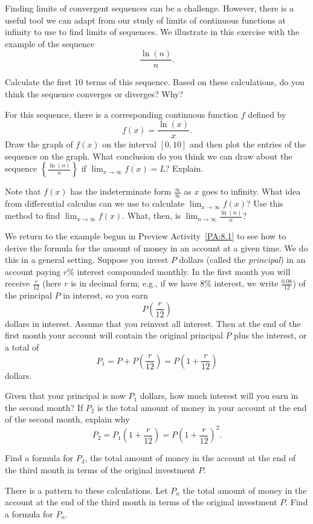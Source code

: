 \begin{exercises}
\item Finding limits of convergent sequences can be a challenge. However, there is a useful tool we can adapt from our study of limits of continuous functions at infinity to use to find limits of sequences. We illustrate in this exercise with the example of the sequence
    \[\frac{\ln(n)}{n}.\]
    \ba
    \item Calculate the first 10 terms of this sequence. Based on these calculations, do you think the sequence converges or diverges? Why?

    \item For this sequence, there is a corresponding continuous function $f$ defined by
    \[f(x) = \frac{\ln(x)}{x}.\]
    Draw the graph of $f(x)$ on the interval $[0,10]$ and then plot the entries of the sequence on the graph. What conclusion do you think we can draw about the sequence $\left\{\frac{\ln(n)}{n}\right\}$ if $\lim_{x \to \infty} f(x) = L$? Explain.

    \item Note that $f(x)$ has the indeterminate form $\frac{\infty}{\infty}$ as $x$ goes to infinity. What idea from differential calculus can we use to calculate $\lim_{x \to \infty} f(x)$? Use this method to find $\lim_{x \to \infty} f(x)$. What, then, is $\lim_{n \to \infty} \frac{\ln(n)}{n}$?

    \ea


\item We return to the example begun in Preview Activity~\ref{PA:8.1} to see how to derive the formula for the amount of money in an account at a given time. We do this in a general setting. Suppose you invest $P$ dollars (called the \emph{principal}) in an account paying $r\%$ interest compounded monthly. In the first month you will receive $\frac{r}{12}$ (here $r$ is in decimal form; e.g., if we have $8\%$ interest, we write $\frac{0.08}{12}$) of the principal $P$ in interest, so you earn
    \[P\left(\frac{r}{12}\right)\]
    dollars in interest. Assume that you reinvest all interest. Then at the end of the first month your account will contain the original principal $P$ plus the interest, or a total of
    \[P_1 = P + P\left(\frac{r}{12}\right) = P\left( 1 + \frac{r}{12}\right)\]
    dollars.
    \ba
    \item Given that your principal is now $P_1$ dollars, how much interest will you earn in the second month? If $P_2$ is the total amount of money in your account at the end of the second month, explain why
        \[P_2 = P_1\left( 1 + \frac{r}{12}\right) = P\left( 1 + \frac{r}{12}\right)^2.\]
    \item Find a formula for $P_3$, the total amount of money in the account at the end of the third month in terms of the original investment $P$.
    \item There is a pattern to these calculations. Let $P_n$ the total amount of money in the account at the end of the third month in terms of the original investment $P$. Find a formula for $P_n$.
    \ea


\end{exercises}
